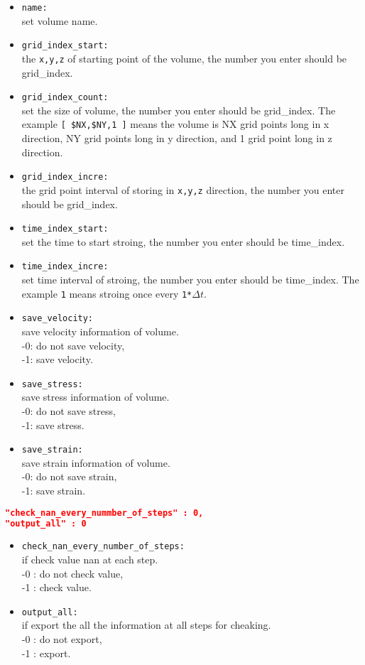 \begin{itemize}
	\item \verb|name:| \\
	set volume name.
	\item \verb|grid_index_start:| \\
	the \verb|x,y,z| of starting point of the volume, the number you enter should be grid\_index.
	\item \verb|grid_index_count:| \\
	set the size of volume, the number you enter should be grid\_index. The example \verb|[ $NX,$NY,1 ]| means the volume is NX grid points long in x direction, NY grid points long in y direction, and 1 grid point long in z direction.
	\item \verb|grid_index_incre:| \\
	the grid point interval of storing in \verb|x,y,z| direction, the number you enter should be grid\_index.
	\item \verb|time_index_start:| \\
	set the time to start stroing, the number you enter should be time\_index. 
	\item \verb|time_index_incre:| \\
	set time interval of stroing, the number you enter should be time\_index. The example \verb|1| means stroing once every \verb|1*|$\Delta t$.
	\item \verb|save_velocity:| \\
	save velocity information of volume.\\
	-0: do not save velocity,\\
	-1: save velocity.
	\item \verb|save_stress:| \\
	save stress information of volume.\\
	-0: do not save stress,\\
	-1: save stress.
	\item \verb|save_strain:| \\
	save strain information of volume.\\
	-0: do not save strain,\\
	-1: save strain.
\end{itemize}
\begin{lstlisting}[language=json,
	caption=Example of output check\_nan,
	label={nan},commentstyle=\color{codegreen},
	frame=tb] 
"check_nan_every_nummber_of_steps" : 0,
"output_all" : 0 
\end{lstlisting}
\begin{itemize}
	\item \verb|check_nan_every_number_of_steps:| \\
	if check value nan at each step.\\
	-0 : do not check value,\\
	-1 : check value.
	\item \verb|output_all:| \\
	if export the all the information at all steps for cheaking.\\
	-0 : do not export,\\
	-1 : export.
\end{itemize}
